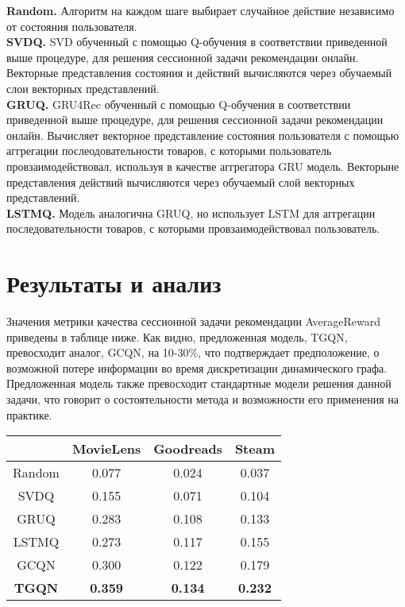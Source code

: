 \documentclass{mipt-thesis-ms}
\begin{document}
{\bf Random.} Алгоритм на каждом шаге выбирает случайное действие независимо от состояния пользователя.\\

{\bf SVDQ.} SVD обученный с помощью Q-обучения в соответствии приведенной выше процедуре, для решения сессионной задачи рекомендации онлайн. Векторные представления состояния и действий вычисляются через обучаемый слои векторных представлений.\\

{\bf GRUQ.} GRU4Rec обученный с помощью Q-обучения в соответствии приведенной выше процедуре, для решения сессионной задачи рекомендации онлайн. Вычисляет векторное представление состояния пользователя с помощью аггрегации послеодовательности товаров, с которыми пользователь провзаимодействовал, используя в качестве аггрегатора GRU модель. Векторыне представления действий вычисляются через обучаемый слой векторных представлений.\\

{\bf LSTMQ.} Модель аналогична GRUQ, но использует LSTM для аггрегации последовательности товаров, с которыми провзаимодействовал пользователь.\\


\section{Результаты и анализ}
Значения метрики качества сессионной задачи рекомендации AverageReward приведены в таблице ниже. Как видно, предложенная
модель, TGQN, превосходит аналог, GCQN, на 10-30\%, что подтверждает предположение, о возможной потере информации во время дискретизации динамического графа. Предложенная модель также превосходит стандартные модели решения данной задачи, что говорит о состоятельности метода и возможности его применения на практике.\\


\begin{table}[!b]
\begin{tabular}{|c|c|c|c|}
\hline
              & MovieLens      & Goodreads      & Steam          \\ \hline
Random        & 0.077          & 0.024          & 0.037          \\ \hline
SVDQ          & 0.155          & 0.071           & 0.104          \\ \hline
GRUQ          & 0.283          & 0.108          & 0.133          \\ \hline
LSTMQ         & 0.273          & 0.117          & 0.155          \\ \hline
GCQN          & 0.300          & 0.122          & 0.179          \\ \hline
\textbf{TGQN} & \textbf{0.359} & \textbf{0.134} & \textbf{0.232} \\ \hline
\end{tabular}
\end{table}
\end{document}
